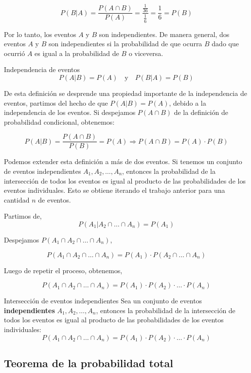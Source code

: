 $$
  P(B|A) = \frac{P(A \cap B)}{P(A)} = \frac{\frac{1}{36}}{\frac{1}{6}} = \frac{1}{6} = P(B)
$$

Por lo tanto, los eventos $A$ y $B$ son independientes. De manera general, dos eventos $A$ y $B$ son independientes si la probabilidad de que ocurra $B$ dado que ocurrió $A$ es igual a la probabilidad de $B$ o viceversa.

\begin{definicion}{Independencia de eventos}
  \[
    P(A|B) = P(A) \quad \text{y} \quad P(B|A) = P(B)
  \]
\end{definicion}

De esta definición se desprende una propiedad importante de la independencia de eventos, partimos del hecho de que $P(A|B) = P(A)$, debido a la independencia de los eventos. Si despejamos $P(A \cap B)$ de la definición de probabilidad condicional, obtenemos:

\[
  P(A|B) = \frac{P(A \cap B)}{P(B)} = P(A) \Rightarrow P(A \cap B) = P(A) \cdot P(B)
\]

Podemos extender esta definición a más de dos eventos. Si tenemos un conjunto de eventos independientes $A_1, A_2, \ldots, A_n$, entonces la probabilidad de la intersección de todos los eventos es igual al producto de las probabilidades de los eventos individuales. Esto se obtiene
iterando el trabajo anterior para una cantidad $n$ de eventos.

Partimos de,
\[
  P(A_1|A_2 \cap \ldots \cap A_n) = P(A_1)
\]

Despejamos $P(A_1 \cap A_2 \cap \ldots \cap A_n)$,

\[
  P(A_1 \cap A_2 \cap \ldots \cap A_n) = P(A_1) \cdot P(A_2 \cap \ldots \cap A_n)
\]

Luego de repetir el proceso, obtenemos,

\[
  P(A_1 \cap A_2 \cap \ldots \cap A_n) = P(A_1) \cdot P(A_2) \cdot \ldots \cdot P(A_n)
\]

\begin{definicion}{Intersección de eventos independientes}
  Sea un conjunto de eventos \textbf{independientes} $A_1, A_2, \ldots, A_n$, entonces la probabilidad de la intersección de todos los eventos es igual al producto de las probabilidades de los eventos individuales:
  \[
    P(A_1 \cap A_2 \cap \ldots \cap A_n) = P(A_1) \cdot P(A_2) \cdot \ldots \cdot P(A_n)
  \]
\end{definicion}

\subsection{Teorema de la probabilidad total}

